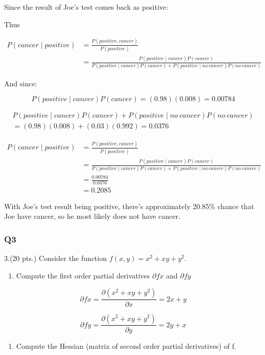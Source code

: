 \documentclass[11pt]{article}
\providecommand{\tightlist}{%
      \setlength{\itemsep}{0pt}\setlength{\parskip}{0pt}}
\begin{document}
Since the result of Joe's test comes back as positive:

Thus

\begin{align}P(cancer \mid positive) &= \frac{P(positive, cancer)}{P(positive)} \\
&= \frac{P(positive\mid cancer) P(cancer)}{P(positive \mid cancer) P(cancer) + P(positive \mid no \: cancer)P(no \: cancer)}
\end{align}

And since:

\[P(positive\mid cancer) P(cancer) = (0.98)(0.008)=0.00784\]

\begin{align}P(positive \mid cancer) P(cancer) + P(positive \mid no \: cancer)P(no \: cancer)\\
= (0.98)(0.008)+(0.03)(0.992)= 0.0376
\end{align}

\begin{align}P(cancer \mid positive) &= \frac{P(positive, cancer)}{P(positive)} \\
&= \frac{P(positive\mid cancer) P(cancer)}{P(positive \mid cancer) P(cancer) + P(positive \mid no \: cancer)P(no \: cancer)} \\
&=\frac{0.00784}{0.0376} \\
&= 0.2085
\end{align}

With Joe's test result being positive, there's approximately 20.85\%
chance that Joe have cancer, so he most likely does not have cancer.

    \subsubsection*{Q3}\label{q3}

    3.(20 pts.) Consider the function \(f(x, y) = x^2 + xy + y^2\).

    \begin{enumerate}
\def\labelenumi{(\alph{enumi})}
\tightlist
\item
  Compute the first order partial derivatives \(\partial fx\) and
  \(\partial fy\)
\end{enumerate}

    \[\partial fx = \frac{\partial (x^2 + xy + y^2)}{\partial x} = 2x+y\]

\[\partial fy = \frac{\partial (x^2 + xy + y^2)}{\partial y} = 2y+x\]

    \begin{enumerate}
\def\labelenumi{(\alph{enumi})}
\setcounter{enumi}{1}
\tightlist
\item
  Compute the Hessian (matrix of second order partial derivatives) of f.
\end{enumerate}
\end{document}
